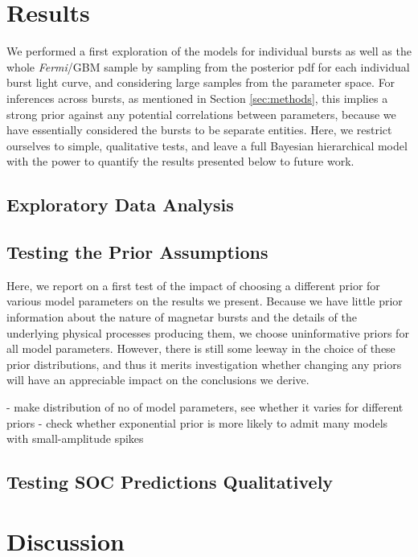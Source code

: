\documentclass[12pt]{emulateapj}
\begin{document}
\section{Results}

We performed a first exploration of the models for individual bursts as well as the whole {\it Fermi}/GBM
sample by sampling from the posterior pdf for each individual burst light curve, and considering large
samples from the parameter space. For inferences across bursts, as mentioned in Section \ref{sec:methods},
this implies a strong prior against any potential correlations between parameters, because we have essentially
considered the bursts to be separate entities. Here, we restrict ourselves to simple, qualitative tests, and
leave a full Bayesian hierarchical model with the power to quantify the results presented below to future work. 
 

\subsection{Exploratory Data Analysis}


\subsection{Testing the Prior Assumptions}

Here, we report on a first test of the impact of choosing a different prior for various model parameters on the 
results we present. Because we have little prior information about the nature of magnetar bursts and the details of
the underlying physical processes producing them, we choose uninformative priors for all model parameters. However,
there is still some leeway in the choice of these prior distributions, and thus it merits investigation whether changing
any priors will have an appreciable impact on the conclusions we derive. 


- make distribution of no of model parameters, see whether it varies for different priors
- check whether exponential prior is more likely to admit many models with small-amplitude spikes

\subsection{Testing SOC Predictions Qualitatively}



\section{Discussion}
\end{document}
